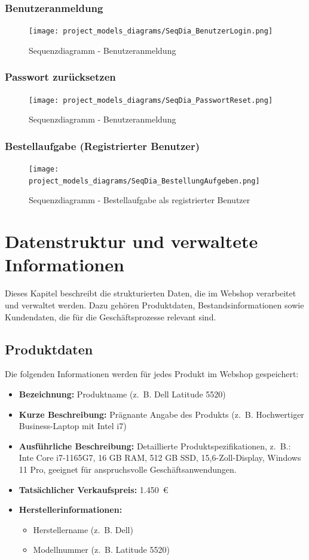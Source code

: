 \documentclass[%
	12pt,
	a4paper,
	oneside,
	parskip=full
]{scrbook}
\begin{document}
	\subsection{Benutzeranmeldung}
	\begin{figure}[H]
		\centering
		\texttt{[image: project\_models\_diagrams/SeqDia\_BenutzerLogin.png]}
		\caption{Sequenzdiagramm - Benutzeranmeldung}
	\end{figure}
	
	\subsection{Passwort zurücksetzen}
	\begin{figure}[H]
		\centering
		\texttt{[image: project\_models\_diagrams/SeqDia\_PasswortReset.png]}
		\caption{Sequenzdiagramm - Benutzeranmeldung}
	\end{figure}
	
	\subsection{Bestellaufgabe (Registrierter Benutzer)}
	\begin{figure}[H]
		\centering
		\texttt{[image: project\_models\_diagrams/SeqDia\_BestellungAufgeben.png]}
		\caption{Sequenzdiagramm - Bestellaufgabe als registrierter Benutzer}
	\end{figure}

\chapter{Datenstruktur und verwaltete Informationen}
Dieses Kapitel beschreibt die strukturierten Daten, die im Webshop verarbeitet und verwaltet werden. Dazu gehören Produktdaten, Bestandsinformationen sowie Kundendaten, die für die Geschäftsprozesse relevant sind.

\section{Produktdaten}
Die folgenden Informationen werden für jedes Produkt im Webshop gespeichert:

\begin{itemize}
	\item \textbf{Bezeichnung:} Produktname (z.~B. Dell Latitude 5520)
	\item \textbf{Kurze Beschreibung:} Prägnante Angabe des Produkts (z.~B. Hochwertiger Business-Laptop mit Intel i7)
	\item \textbf{Ausführliche Beschreibung:}  
	Detaillierte Produktspezifikationen, z.~B.:  
	Inte Core i7-1165G7, 16 GB RAM, 512 GB SSD, 15,6-Zoll-Display, Windows 11 Pro, geeignet für anspruchsvolle Geschäftsanwendungen.
	\item \textbf{Tatsächlicher Verkaufspreis:} 1.450~\euro
	\item \textbf{Herstellerinformationen:}  
	\begin{itemize}
		\item Herstellername (z.~B. Dell)  
		\item Modellnummer (z.~B. Latitude 5520)  
	\end{itemize}
\end{itemize}
\end{document}
